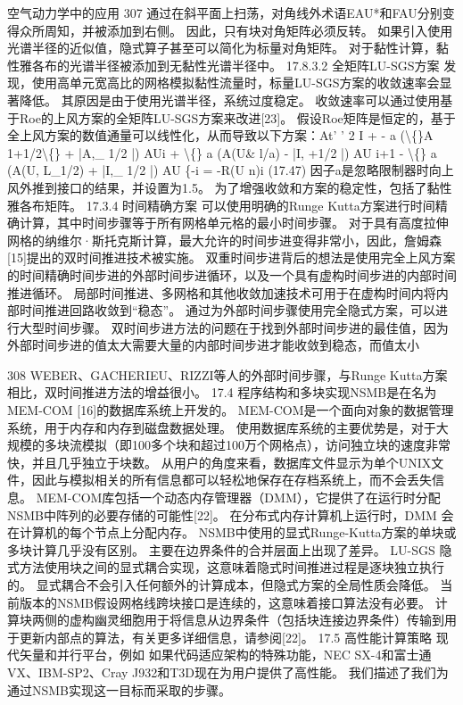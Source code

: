 \documentclass[UTF8,11pt,a4paper,openany,fontset=fandol]{ctexbook}
\begin{document}
空气动力学中的应用 307 通过在斜平面上扫荡，对角线外术语EAU*和FAU分别变得众所周知，并被添加到右侧。 因此，只有块对角矩阵必须反转。 如果引入使用光谱半径的近似值，隐式算子甚至可以简化为标量对角矩阵。 对于黏性计算，黏性雅各布的光谱半径被添加到无黏性光谱半径中。 17.8.3.2 全矩阵LU-SGS方案 发现，使用高单元宽高比的网格模拟黏性流量时，标量LU-SGS方案的收敛速率会显著降低。 其原因是由于使用光谱半径，系统过度稳定。 收敛速率可以通过使用基于Roe的上风方案的全矩阵LU-SGS方案来改进[23]。 假设Roe矩阵是恒定的，基于全上风方案的数值通量可以线性化，从而导致以下方案：At' ' 2 I + - a (\textbackslash\{\}A 1+1/2\textbackslash\{\} + |A,\_ 1/2 |) AUi + \textbackslash\{\} a (A(U\& l/a) - |I, +1/2 |) AU i+1 - \textbackslash\{\} a (A(U, L\_1/2) + |I,\_ 1/2 |) AU \{-i = -R(U n)i (17.47) 因子a是忽略限制器时向上风外推到接口的结果，并设置为1.5。 为了增强收敛和方案的稳定性，包括了黏性雅各布矩阵。 17.3.4 时间精确方案 可以使用明确的Runge Kutta方案进行时间精确计算，其中时间步骤等于所有网格单元格的最小时间步骤。 对于具有高度拉伸网格的纳维尔·斯托克斯计算，最大允许的时间步进变得非常小，因此，詹姆森[15]提出的双时间推进技术被实施。 双重时间步进背后的想法是使用完全上风方案的时间精确时间步进的外部时间步进循环，以及一个具有虚构时间步进的内部时间推进循环。 局部时间推进、多网格和其他收敛加速技术可用于在虚构时间内将内部时间推进回路收敛到“稳态”。 通过为外部时间步骤使用完全隐式方案，可以进行大型时间步骤。 双时间步进方法的问题在于找到外部时间步进的最佳值，因为外部时间步进的值太大需要大量的内部时间步进才能收敛到稳态，而值太小

308 WEBER、GACHERIEU、RIZZI等人的外部时间步骤，与Runge Kutta方案相比，双时间推进方法的增益很小。 17.4 程序结构和多块实现NSMB是在名为MEM-COM [16]的数据库系统上开发的。 MEM-COM是一个面向对象的数据管理系统，用于内存和内存到磁盘数据处理。 使用数据库系统的主要优势是，对于大规模的多块流模拟（即100多个块和超过100万个网格点），访问独立块的速度非常快，并且几乎独立于块数。 从用户的角度来看，数据库文件显示为单个UNIX文件，因此与模拟相关的所有信息都可以轻松地保存在存档系统上，而不会丢失信息。 MEM-COM库包括一个动态内存管理器（DMM），它提供了在运行时分配NSMB中阵列的必要存储的可能性[22]。 在分布式内存计算机上运行时，DMM 会在计算机的每个节点上分配内存。 NSMB中使用的显式Runge-Kutta方案的单块或多块计算几乎没有区别。 主要在边界条件的合并层面上出现了差异。 LU-SGS 隐式方法使用块之间的显式耦合实现，这意味着隐式时间推进过程是逐块独立执行的。 显式耦合不会引入任何额外的计算成本，但隐式方案的全局性质会降低。 当前版本的NSMB假设网格线跨块接口是连续的，这意味着接口算法没有必要。 计算块两侧的虚构幽灵细胞用于将信息从边界条件（包括块连接边界条件）传输到用于更新内部点的算法，有关更多详细信息，请参阅[22]。 17.5 高性能计算策略 现代矢量和并行平台，例如 如果代码适应架构的特殊功能，NEC SX-4和富士通VX、IBM-SP2、Cray J932和T3D现在为用户提供了高性能。 我们描述了我们为通过NSMB实现这一目标而采取的步骤。
\end{document}
